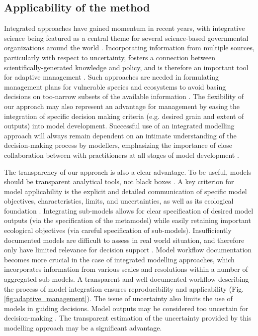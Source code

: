 \subsection*{Applicability of the method}
Integrated approaches have gained momentum in recent years, with integrative science being featured as a central theme for several science-based governmental organizations around the world \citep[e.g.][]{Bernier2013}. 
Incorporating information from multiple sources, particularly with respect to uncertainty,  fosters a connection between scientifically-generated knowledge and policy, and is therefore an important tool for adaptive management \citep[][Fig. \ref{fig:adaptive_management}; ]{Rehme2011}.
Such approaches are needed in formulating management plans for vulnerable species and ecosystems to avoid basing decisions on too-narrow subsets of the available information \citep{Dawson2011}.
The flexibility of our approach may also represent an advantage for management by easing the integration of specific decision making criteria (e.g. desired grain and extent of outputs) into model development. 
Successful use of an integrated modelling approach will always remain dependent on an intimate understanding of the decision-making process by modellers, emphasizing the importance of close collaboration between with practitioners at all stages of model development \citep{Guisan2013}.

The transparency of our approach is also a clear advantage. 
To be useful, models should be transparent analytical tools, not black boxes \citep{Addison2013}. 
A key criterion for model applicability is the explicit and detailed communication of specific model objectives, characteristics, limits, and uncertainties, as well as its ecological foundation \citep{Guisan2013}.
Integrating sub-models allows for clear specification of desired model outputs (via the specification of the metamodel) while easily retaining important ecological objectives (via careful specification of sub-models).
Insufficiently documented models are difficult to assess in real world situation, and therefore only have limited relevance for decision support \citep{Guisan2013}.
Model workflow documentation becomes more crucial in the case of integrated modelling approaches, which incorporates information from various scales and resolutions within a number of aggregated sub-models. 
A transparent and well documented workflow describing the process of model integration ensures reproducibility and applicability (Fig. \ref{fig:adaptive_management}). 
The issue of uncertainty also limits the use of models in guiding decisions. 
Model outputs may be considered too uncertain for decision-making \citep{Addison2013}. 
The transparent estimation of the uncertainty provided by this modelling approach may be a significant advantage. 


